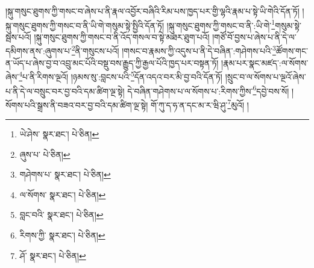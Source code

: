 །སྐུ་གསུང་ཐུགས་ཀྱི་གསང་བ་ཞེས་པ་ནི་རྣལ་འབྱོར་བཞིའི་རིམ་པས་ཁྱད་པར་གྱི་ལྷའི་རྣམ་པ་སྟེ་ཡི་གེའི་དོན་ཏོ། །སྐུ་གསུང་ཐུགས་ཀྱི་གསང་བ་ནི་ཡི་གེ་གསུམ་སྟེ་སྤྱིའི་དོན་ཏོ། །སྐུ་གསུང་ཐུགས་ཀྱི་གསང་བ་ནི་:ཡི་གེ་\footnote{ཡེ་ཤེས་  སྣར་ཐང་།  པེ་ཅིན། }གསུམ་སྟེ་སྦས་པའོ། །སྐུ་གསུང་ཐུགས་ཀྱི་གསང་བ་ནི་འོད་གསལ་བ་སྟེ་མཐར་ཐུག་པའོ། །གཙོ་བོ་བྱས་པ་ཞེས་པ་ནི་དེ་ལ་དམིགས་ནས་:ཞུགས་པ་\footnote{ཞུས་པ་  པེ་ཅིན། }ནི་གསུངས་པའོ། །གསང་བ་རྣམས་ཀྱི་འདུས་པ་ནི་དེ་བཞིན་:གཤེགས་པའི་\footnote{གཤེགས་པ་  སྣར་ཐང་།  པེ་ཅིན། }ཚོགས་གང་ན་ཡོད་པ་ཞེས་བྱ་བ་འབྲུ་མང་པོའི་བསྡུ་བས་རྒྱུད་ཀྱི་རྒྱལ་པོའི་ཁྱད་པར་བསྟན་ཏོ། །རྣམ་པར་སྣང་མཛད་:ལ་སོགས་ཞེས་\footnote{ལ་སོགས་  སྣར་ཐང་།  པེ་ཅིན། }པ་ནི་རིགས་ལྔའོ། །ཉམས་སུ་:བླངས་པའི་\footnote{བླང་བའི་  སྣར་ཐང་།  པེ་ཅིན། }དོན་འདའ་བར་མི་བྱ་བའི་དོན་ཏོ། །སྲུང་བ་ལ་སོགས་པ་ལྔའོ་ཞེས་པ་ནི་དེ་ལ་བསྲུང་བར་བྱ་བའི་དམ་ཚིག་ལྔ་སྟེ། དེ་བཞིན་གཤེགས་པ་ལ་སོགས་པ་:རིགས་ཀྱིས་\footnote{རིགས་ཀྱི་  སྣར་ཐང་།  པེ་ཅིན། }དབྱེ་བས་སོ། །སོགས་པའི་སྒྲས་ནི་བཟའ་བར་བྱ་བའི་དམ་ཚིག་ལྔ་སྟེ། གོ་ཀུ་ད་ཧ་ན་དང་མ་ར་ཝི་ཤུ་\footnote{ཤོ་  སྣར་ཐང་།  པེ་ཅིན། }མུའོ། །
